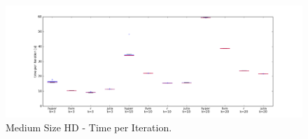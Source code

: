 \begin{figure}[htsb]
  \raggedleft
  \includegraphics[scale=0.4, trim="0cm 1cm 0cm 0cm"]{figures/charts/15Mxhd_all}
  \caption[Medium Size HD - Time per Iteration]{Medium Size HD - Time per Iteration.}
  \label{fig:15Mxhd_all}
\end{figure}



